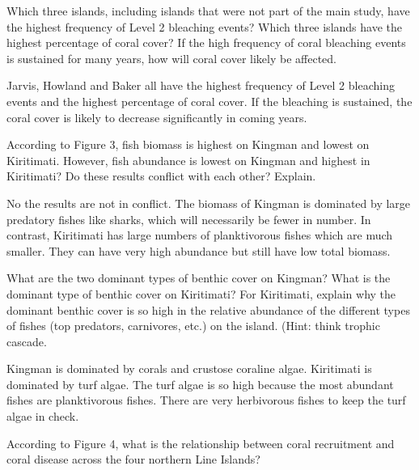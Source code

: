 \documentclass[11pt, addpoints]{exam}
\begin{document}
\begin{questions}

\question[5]
Which three islands, including islands that were not part of the main study, have the highest frequency of Level 2 bleaching events? Which three islands have the highest percentage of coral cover? If the high frequency of coral bleaching events is sustained for many years, how will coral cover likely be affected. 

\begin{solution}

Jarvis, Howland and Baker all have the highest frequency of Level 2 bleaching events and the highest percentage of coral cover.  If the bleaching is sustained, the coral cover is likely to decrease significantly in coming years.

\end{solution}

\question[3]
According to Figure 3, fish biomass is highest on Kingman and lowest on Kiritimati. However, fish abundance is lowest on Kingman and highest in Kiritimati? Do these results conflict with each other?  Explain.

\begin{solution}
No the results are not in conflict. The biomass of Kingman is dominated by large predatory fishes like sharks, which will necessarily be fewer in number.  In contrast, Kiritimati has large numbers of planktivorous fishes which are much smaller. They can have very high abundance but still have low total biomass.
\end{solution}

\question[5]
What are the two dominant types of benthic cover on Kingman? What is the dominant type of benthic cover on Kiritimati?  For Kiritimati, explain why the dominant benthic cover is so high in the relative abundance of the different types of fishes (top predators, carnivores, etc.) on the island. (Hint: think trophic cascade.

\begin{solution}
Kingman is dominated by corals and crustose coraline algae. Kiritimati is dominated by turf algae.  The turf algae is so high because the most abundant fishes are planktivorous fishes. There are very herbivorous fishes to keep the turf algae in check.
\end{solution}

\question[2]
According to Figure 4, what is the relationship between coral recruitment and coral disease across the four northern Line Islands?


\end{questions}
\end{document}
